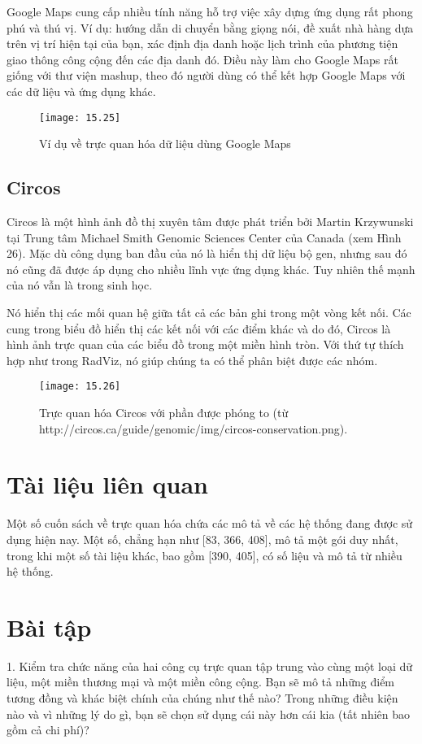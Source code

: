 \documentclass[13pt]{scrartcl} %
\begin{document}
Google Maps cung cấp nhiều tính năng hỗ trợ việc xây dựng ứng dụng rất phong phú và thú vị. Ví dụ: hướng dẫn di chuyển bằng giọng nói, đề xuất nhà hàng dựa trên vị trí hiện tại của bạn, xác định địa danh hoặc lịch trình của phương tiện giao thông công cộng đến các địa danh đó. Điều này làm cho Google Maps rất giống với thư viện mashup, theo đó người dùng có thể kết hợp Google Maps với các dữ liệu và ứng dụng khác.

\begin{figure}[!ht]
    \centering
    \texttt{[image: 15.25]}
    \caption{Ví dụ về trực quan hóa dữ liệu dùng Google Maps}
\end{figure}

\subsection{Circos}
Circos là một hình ảnh đồ thị xuyên tâm được phát triển bởi Martin Krzywunski tại Trung tâm Michael Smith Genomic Sciences Center của Canada (xem Hình 26). Mặc dù công dụng ban đầu của nó là hiển thị dữ liệu bộ gen, nhưng sau đó nó cũng đã được áp dụng cho nhiều lĩnh vực ứng dụng khác. Tuy nhiên thế mạnh của nó vẫn là trong sinh học.

Nó hiển thị các mối quan hệ giữa tất cả các bản ghi trong một vòng kết nối. Các cung trong biểu đồ hiển thị các kết nối với các điểm khác và do đó, Circos là hình ảnh trực quan của các biểu đồ trong một miền hình tròn. Với thứ tự thích hợp như trong RadViz, nó giúp chúng ta có thể phân biệt được các nhóm.

\begin{figure}[!ht]
    \centering
    \texttt{[image: 15.26]}
    \caption{Trực quan hóa Circos với phần được phóng to (từ http://circos.ca/guide/genomic/img/circos-conservation.png).}
\end{figure}

\section{Tài liệu liên quan}
Một số cuốn sách về trực quan hóa chứa các mô tả về các hệ thống đang được sử dụng hiện nay. Một số, chẳng hạn như [83, 366, 408], mô tả một gói duy nhất, trong khi một số tài liệu khác, bao gồm [390, 405], có số liệu và mô tả từ nhiều hệ thống.

\section{Bài tập}
1. Kiểm tra chức năng của hai công cụ trực quan tập trung vào cùng một loại dữ liệu, một miền thương mại và một miền công cộng. Bạn sẽ mô tả những điểm tương đồng và khác biệt chính của chúng như thế nào? Trong những điều kiện nào và vì những lý do gì, bạn sẽ chọn sử dụng cái này hơn cái kia (tất nhiên bao gồm cả chi phí)?
\end{document}
